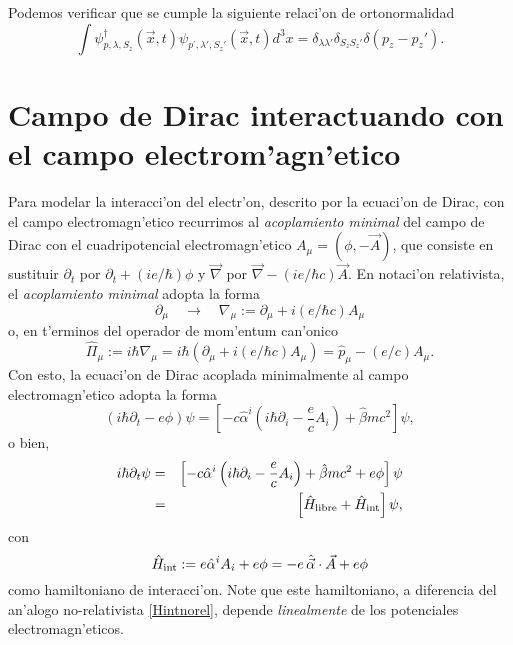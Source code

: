 Podemos verificar que se cumple la siguiente relaci'on de ortonormalidad
\begin{equation}
\int\psi_{p,\lambda,S_{z}}^{\dagger}(\vec{x},t) \psi_{p^{\prime
},\lambda',S_{z}'}(\vec{x},t) d^{3}x=\delta
_{\lambda\lambda'}\delta_{S_{z}S_{z}'}\delta\left(
p_{z}-p_{z}'\right).
\end{equation}

\section{Campo de Dirac interactuando con el campo electrom'agn'etico}

Para modelar la interacci'on del electr'on, descrito por la ecuaci'on de Dirac,
con el campo electromagn'etico recurrimos al \textit{acoplamiento minimal} del
campo de Dirac con el cuadripotencial electromagn'etico
$A_\mu=(\phi,-\vec{A})$, que consiste en sustituir $\partial_t$ por $\partial_t+(ie/\hbar)\phi$ y $\vec{\nabla}$ por $\vec{\nabla}-(ie/\hbar c)\vec{A}$. En notaci'on
relativista, el \textit{acoplamiento minimal} adopta la forma
\begin{equation}
\partial_\mu \quad \rightarrow\quad
\nabla_\mu:=\partial_\mu+i(e/\hbar c)A_\mu 
\end{equation}
o, en t'erminos del operador de mom'entum can'onico 
\begin{equation}
\hat{\Pi}_\mu:=i\hbar\nabla_\mu=i\hbar\left(\partial_\mu+i(e/\hbar c)A_\mu \right)
= \hat{p}_\mu-(e/c)A_\mu.
\end{equation}
Con esto, la ecuaci'on de Dirac acoplada minimalmente al campo electromagn'etico
adopta la forma
\begin{equation}
\left( i\hbar\partial_{t}-e\phi\right) \psi  =\left[ 
-c\hat{\alpha}^i\left(i\hbar\partial_i-\frac{e}{c}A_i\right)
+\hat{\beta}mc^2\right]  \psi,
\end{equation} 
o bien,
\begin{eqnarray}
 i\hbar\partial_{t} \psi &=&\left[ -c\hat{\alpha}^i\left(i\hbar
\partial_i-\frac{e}{c}A_i\right) +\hat{\beta}mc^2+e\phi \right]  \psi \\
 &=&\left[\hat{H}_{\rm libre}+\hat{H}_{\rm int}\right] \psi,
\end{eqnarray} 
con
\begin{equation}
\hat{H}_{\rm int}:=e\hat{\alpha}^iA_i +e\phi =-e\,\hat{\vec{\alpha}}\cdot
\vec{A} +e\phi 
\end{equation} 
como hamiltoniano de interacci'on. Note que este hamiltoniano, a diferencia del an'alogo no-relativista \eqref{Hintnorel}, depende \textit{linealmente} de los potenciales electromagn'eticos.


